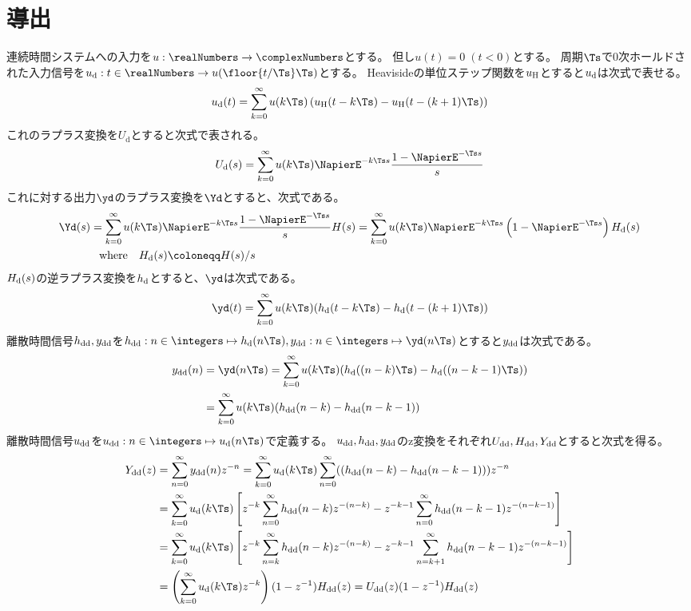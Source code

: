     \section{導出}
        連続時間システムへの入力を$u:\realNumbers\to\complexNumbers$とする。
        但し$u(t)=0\;(t<0)$とする。
        周期$\Ts$で0次ホールドされた入力信号を$\ud:t\in\realNumbers\to u(\floor{t/\Ts}\Ts)$とする。
        Heavisideの単位ステップ関数を$u_\text{H}$とすると$u_\text{d}$は次式で表せる。
        \[ \ud(t) = \sum_{k=0}^\infty u(k\Ts)\left(\uH(t-k\Ts) - \uH(t-(k+1)\Ts)\right) \]
        これのラプラス変換を$U_\text{d}$とすると次式で表される。
        \[ \Ud(s) = \sum_{k=0}^\infty u(k\Ts)\NapierE^{-k\Ts s}\frac{1-\NapierE^{-\Ts s}}{s} \]
        これに対する出力$\yd$のラプラス変換を$\Yd$とすると、次式である。
        \begin{align*}
            \Yd(s) &= \sum_{k=0}^\infty u(k\Ts)\NapierE^{-k\Ts s}\frac{1-\NapierE^{-\Ts s}}{s}H(s) = \sum_{k=0}^\infty u(k\Ts)\NapierE^{-k\Ts s}\left(1-\NapierE^{-\Ts s}\right)\Hd(s) \\
            &\phantom{=} \text{where} \quad \Hd(s) \coloneqq H(s)/s
        \end{align*}
        $H_\text{d}(s)$の逆ラプラス変換を$h_\text{d}$とすると、$\yd$は次式である。
        \[ \yd(t) = \sum_{k=0}^\infty u(k\Ts)(\hd(t-k\Ts)-\hd(t-(k+1)\Ts)) \]
        離散時間信号$h_\text{dd},y_\text{dd}$を$\hdd:n\in\integers\mapsto \hd(n\Ts),\ydd:n\in\integers\mapsto \yd(n\Ts)$とすると$y_\text{dd}$は次式である。
        \begin{align*}
            \ydd(n) &= \yd(n\Ts) = \sum_{k=0}^\infty u(k\Ts)(\hd((n-k)\Ts)-\hd((n-k-1)\Ts)) \\
            &= \sum_{k=0}^\infty u(k\Ts)(\hdd(n-k)-\hdd(n-k-1))
        \end{align*}
        離散時間信号$u_\text{dd}$を$\udd:n\in\integers\mapsto\ud(n\Ts)$で定義する。
        $u_\text{dd},h_\text{dd},y_\text{dd}$のz変換をそれぞれ$U_\text{dd},H_\text{dd},Y_\text{dd}$とすると次式を得る。
        \begin{align*}
            \Ydd(z) &= \sum_{n=0}^\infty \ydd(n) z^{-n} = \sum_{k=0}^\infty \ud(k\Ts) \sum_{n=0}^\infty ((\hdd(n-k)-\hdd(n-k-1))) z^{-n} \\
            &= \sum_{k=0}^\infty \ud(k\Ts)\left[z^{-k}\sum_{n=0}^\infty \hdd(n-k)z^{-(n-k)} - z^{-k-1}\sum_{n=0}^\infty \hdd(n-k-1)z^{-(n-k-1)}\right] \\
            &= \sum_{k=0}^\infty \ud(k\Ts)\left[z^{-k}\sum_{n=k}^\infty \hdd(n-k)z^{-(n-k)} - z^{-k-1}\sum_{n=k+1}^\infty \hdd(n-k-1)z^{-(n-k-1)}\right] \\
            &= \left(\sum_{k=0}^\infty \ud(k\Ts)z^{-k}\right)(1-z^{-1})\Hdd(z) = \Udd(z)(1-z^{-1})\Hdd(z)
        \end{align*}